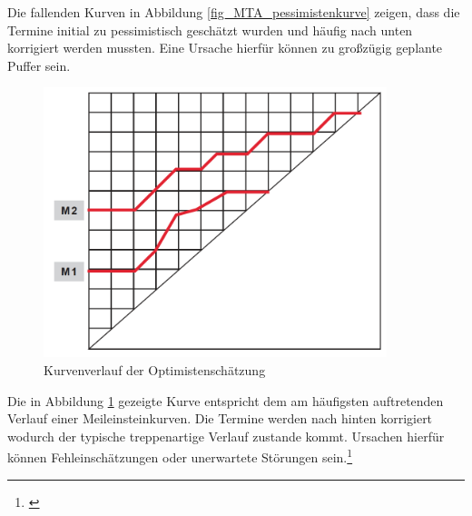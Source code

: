Die fallenden Kurven in Abbildung \ref{fig_MTA_pessimistenkurve} zeigen, dass die Termine initial zu pessimistisch geschätzt wurden und häufig nach unten korrigiert werden mussten. Eine Ursache hierfür können zu großzügig geplante Puffer sein.

\begin{figure}[h!]
	\centering
	\includegraphics[width=10cm]{kapitel/gruppe4_2/bilder/MTA_optimistenkurve}
	\caption{Kurvenverlauf der Optimistenschätzung}
	\label{fig_MTA_optimistenkurve}
\end{figure}

Die in Abbildung \ref{fig_MTA_optimistenkurve} gezeigte Kurve entspricht dem am häufigsten auftretenden Verlauf einer Meileinsteinkurven. Die Termine werden nach hinten korrigiert wodurch der typische treppenartige Verlauf zustande kommt. Ursachen hierfür können Fehleinschätzungen oder unerwartete Störungen sein.\footnote{\cite{gadatsch_masterkurs_2014}}